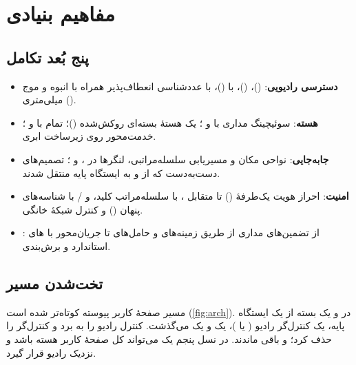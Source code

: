 \documentclass[11pt,a4paper]{article}
\begin{document}
\section{مفاهیم بنیادی}

\subsection{پنج بُعد تکامل}
\begin{itemize}
  \item \textbf{دسترسی رادیویی}:  ()،  ()،  با  ()،  با عددشناسی
        انعطاف‌پذیر همراه با  انبوه و موج میلی‌متری ().
  \item \textbf{هسته}: سوئیچینگ مداری با  و ؛ یک هستهٔ بسته‌ای روکش‌شده ()؛  تمام‌ با
         و ؛  خدمت‌محور روی زیرساخت ابری.
  \item \textbf{جابه‌جایی}: نواحی مکان و مسیریابی سلسله‌مراتبی، لنگرها در ،  و ؛ تصمیم‌های دست‌به‌دست که از 
        و  به ایستگاه پایه منتقل شدند.
  \item \textbf{امنیت}: احراز هویت یک‌طرفهٔ  () تا  متقابل ،  با سلسله‌مراتب کلید، و
        / با شناسه‌های پنهان () و کنترل شبکهٔ خانگی.
  \item \textbf{}: از تضمین‌های مداری از طریق زمینه‌های  و حامل‌های  تا  جریان‌محور با های
        استاندارد و برش‌بندی.
\end{itemize}

\subsection{تخت‌شدن مسیر}
مسیر صفحهٔ کاربر پیوسته کوتاه‌تر شده است (\cref{fig:arch}). در  و  یک بسته از یک ایستگاه پایه، یک کنترل‌گر رادیو
( یا )، یک  و یک  می‌گذشت.  کنترل رادیو را به  برد و کنترل‌گر را حذف کرد؛  و
 باقی ماندند. در نسل پنجم یک  می‌تواند کل صفحهٔ کاربر هسته باشد و نزدیک رادیو قرار گیرد.

\begin{acnfigure}
  \caption{مسیر صفحهٔ کاربر دادهٔ بسته‌ای از نسل ۲٫۵ تا نسل پنجم (ساده‌شده).}
  \label{fig:arch}
\end{acnfigure}
\end{document}
